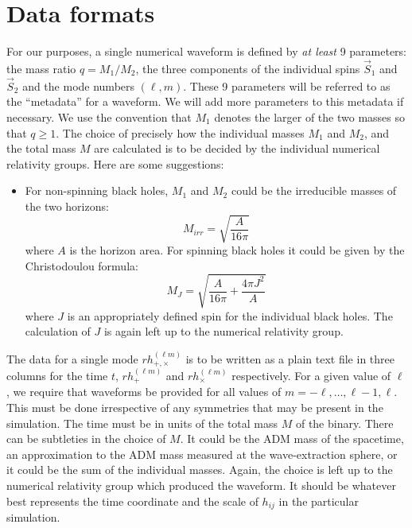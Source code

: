 \documentclass[10pt]{ligodcc}
\begin{document}
\section{Data formats}
\label{sec:format}


For our purposes, a single numerical waveform is defined by \emph{at
  least} 9 parameters: the mass ratio $q = M_1/M_2$, the three
components of the individual spins $\vec{S}_1$ and $\vec{S}_2$ and the
mode numbers $(\ell,m)$.  These 9 parameters will be referred to as the
``metadata'' for a waveform.  We will add more parameters to this
metadata if necessary. We use the convention that $M_1$ denotes the
larger of the two masses so that $q\geq 1$.  The choice of precisely
how the individual masses $M_1$ and $M_2$, and the total mass $M$ are
calculated is to be decided by the individual numerical relativity
groups. Here are some suggestions:
\begin{itemize}
\item For non-spinning black holes, $M_1$ and $M_2$ could be the
irreducible masses of the two horizons:
\begin{equation}
  \label{eq:12}
  M_{irr} = \sqrt{\frac{A}{16\pi}}
\end{equation}
where $A$ is the horizon area.  For spinning black holes it could be
given by the Christodoulou formula:
\begin{equation}
  \label{eq:13}
  M_{J} = \sqrt{\frac{A}{16\pi} + \frac{4\pi J^2}{A}}
\end{equation}
where $J$ is an appropriately defined spin for the individual black
holes.  The calculation of $J$ is again left up to the numerical
relativity group.
\end{itemize}

The data for a single mode $rh_{+,\times}^{(\ell m)}$ is to be written as a
plain text file in three columns for the time $t$, $rh_+^{(\ell m)}$ and
$rh_\times^{(\ell m)}$ respectively.  For a given value of $\ell$, we require
that waveforms be provided for all values of
$m=-\ell,\ldots,\ell-1,\ell$.  This must be done irrespective of any
symmetries that may be present in the simulation.  The time must be in
units of the total mass $M$ of the binary.  There can be subtleties in
the choice of $M$.  It could be the ADM mass of the spacetime, an
approximation to the ADM mass measured at the wave-extraction sphere,
or it could be the sum of the individual masses.  Again, the choice is
left up to the numerical relativity group which produced the waveform.
It should be whatever best represents the time coordinate and the
scale of $h_{ij}$ in the particular simulation.
\end{document}

